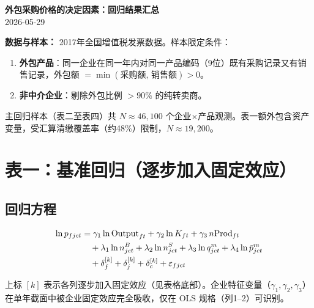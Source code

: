 \documentclass[12pt]{article}
\begin{document}
\begin{center}
  {\large\bfseries 外包采购价格的决定因素：回归结果汇总}\\[6pt]
  {\normalsize 2026-05-29}
\end{center}

\medskip
\noindent\textbf{数据与样本：}
2017年全国增值税发票数据。样本限定条件：
\begin{enumerate}[nosep, leftmargin=2em]
  \item \textbf{外包产品}：同一企业在同一年内对同一产品编码（9位）既有采购记录又有销售记录，外包额 $=\min(\text{采购额},\,\text{销售额})>0$。
  \item \textbf{非中介企业}：剔除外包比例 $>90\%$ 的纯转卖商。
\end{enumerate}
主回归样本（表二至表四）共 $N\approx46{,}100$ 个企业$\times$产品观测。表一额外包含资产变量，受汇算清缴覆盖率（约48\%）限制，$N\approx19{,}200$。

\bigskip

\section*{表一：基准回归（逐步加入固定效应）}

\subsection*{回归方程}

\begin{align}
  \ln p_{fjct}
    &= \gamma_1\ln\mathrm{Output}_{ft}
     + \gamma_2\ln K_{ft}
     + \gamma_3\,n\mathrm{Prod}_{ft} \notag\\
    &\quad + \lambda_1\ln n^{B}_{jct}
           + \lambda_2\ln n^{S}_{jct}
           + \lambda_3\ln q^{m}_{jct}
           + \lambda_4\ln\bar{p}^{m}_{jct} \notag\\
    &\quad + \delta_{f}^{[k]} + \delta_{j}^{[k]} + \delta_{c}^{[k]}
           + \varepsilon_{fjct}
  \label{eq:baseline}
\end{align}

\noindent 上标 $[k]$ 表示各列逐步加入固定效应（见表格底部）。企业特征变量（$\gamma_1,\gamma_2,\gamma_3$）在单年截面中被企业固定效应完全吸收，仅在 OLS 规格（列1--2）可识别。
\end{document}
